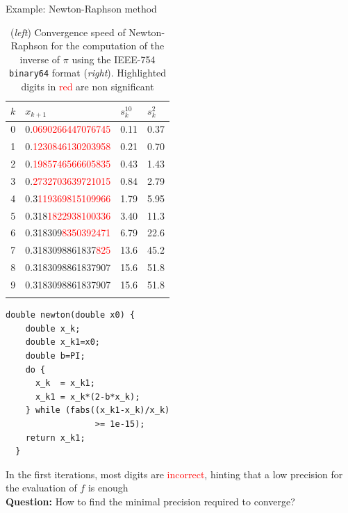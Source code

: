\documentclass[10pt]{beamer}
\begin{document}
\begin{frame}[fragile]{Example: Newton-Raphson method}
\begin{table}
\begin{minipage}{.49\textwidth}
\centering
\footnotesize
\begin{tabular}{rlll}
$k$ & $x_{k+1}$ & $s^{10}_k$ & $s^{2}_k$ \\
\midrule
0 & 0.\textcolor{Red}{0690266447076745} & 0.11 & 0.37 \\
1 & 0.\textcolor{Red}{1230846130203958} & 0.21 & 0.70\\
2 & 0.\textcolor{Red}{1985746566605835} & 0.43 & 1.43 \\
3 & 0.\textcolor{Red}{2732703639721015} & 0.84 & 2.79 \\
4 & 0.3\textcolor{Red}{119369815109966} & 1.79 & 5.95 \\
5 & 0.318\textcolor{Red}{1822938100336} & 3.40 & 11.3 \\
6 & 0.318309\textcolor{Red}{8350392471}  & 6.79 & 22.6\\
7 & 0.3183098861837\textcolor{Red}{825}  & 13.6 & 45.2\\
8 & 0.3183098861837907  & 15.6 & 51.8 \\
9 & 0.3183098861837907 & 15.6 & 51.8 \\
\bottomrule
\vspace{.2mm}
\end{tabular}
\normalsize
\end{minipage}
\begin{minipage}{.49\textwidth}
\begin{lstlisting}[captionpos=b,style=customC]
  double newton(double x0) {
    double x_k;
    double x_k1=x0;
    double b=PI; 
    do {
      x_k  = x_k1; 
      x_k1 = x_k*(2-b*x_k);
    } while (fabs((x_k1-x_k)/x_k) 
                  >= 1e-15);
    return x_k1;
  }
\end{lstlisting}
\end{minipage}
\caption{(\emph{left}) Convergence speed of Newton-Raphson for the computation of the inverse of $\pi$ using the IEEE-754 \texttt{binary64} format (\emph{right}). Highlighted digits in \textcolor{Red}{red} are non significant
}
\label{tab:table_ieee_NR_inverse_pi}
\end{table}
In the first iterations, most digits are \textcolor{Red}{incorrect}, hinting that a low precision for the evaluation of $f$ is enough\\

\textbf{\alert{Question:}} How to find the minimal precision required to converge?
\end{frame}
\end{document}
